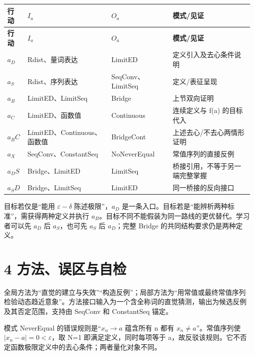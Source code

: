 \documentclass[UTF8,a4paper,zihao=-4,fontset=windows,openany]{ctexbook}
\def\mathrm#1{#1}%
\begin{document}
\begingroup\small\setlength{\tabcolsep}{4pt}
\begin{longtable}{l>{\raggedright\arraybackslash}p{}>{\raggedright\arraybackslash}p{}>{\raggedright\arraybackslash}p{}}
\toprule
\textbf{行动} & \textbf{\(I_a\)} & \textbf{\(O_a\)} & \textbf{模式/见证} \\
\midrule
\endfirsthead
\toprule
\textbf{行动} & \textbf{\(I_a\)} & \textbf{\(O_a\)} & \textbf{模式/见证} \\
\midrule
\endhead
\bottomrule
\endfoot
\bottomrule
\endlastfoot
\(a_D\) & Rdist、量词表达 & LimitED & 定义引入及去心条件说明 \\
\(a_S\) & Rdist、序列表达 & SeqConv、LimitSeq & 定义/表征呈现 \\
\(a_B\) & LimitED、LimitSeq & Bridge & 上节双向证明 \\
\(a_C\) & LimitED、函数值 & Continuous & 连续定义与 f(a) 的目标代入 \\
\(a_\mathrm{BC}\) & LimitED、Continuous、函数值 & BridgeCont & 上述去心/不去心两情形证明 \\
\(a_X\) & SeqConv、ConstantSeq & NoNeverEqual & 常值序列的直接反例 \\
\(a_\mathrm{DS}\) & Bridge、LimitED & LimitSeq & 桥接引用，不等于另一端完整掌握 \\
\(a_\mathrm{SD}\) & Bridge、LimitSeq & LimitED & 同一桥接的反向接口 \\
\end{longtable}
\endgroup

目标若仅是“能用 \(\varepsilon-\delta\) 陈述极限”，\(a_D\) 是一条入口。目标若是“能辨析两种标准”，需获得两种定义并执行 \(a_B\)。目标不同不能假装为同一路线的更优替代。学习者可以先 \(a_D\) 后 \(a_S\)，也可先 \(a_S\) 后 \(a_D\)；完整 Bridge 的共同结构要求仍是两种定义。

\section{4 方法、误区与自检}
全局方法为“直觉的建立与失效”“构造反例”；局部方法为“用常值或最终常值序列检验动态趋近意象”。方法接口输入为一个含全称词的直觉猜测，输出为候选反例及其否定范围，支持由 SeqConv 和 ConstantSeq 锚定。

模式 NeverEqual 的错误规则是\(“x_n\to a\) 蕴含所有 n 都有 \(x_n\ne a”\)。常值序列使 \(|x_n-a|=0<\varepsilon\)，取 N=1 即满足定义，同时每项等于 a，故反驳该规则。它不否定函数极限定义中的去心条件；两者量化对象不同。
\end{document}
